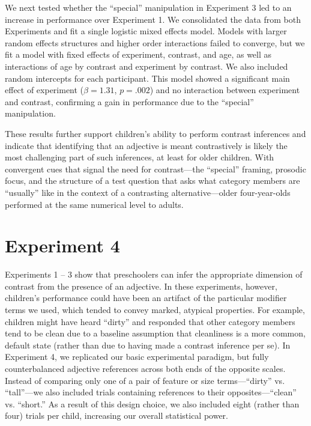 \documentclass[man]{apa2}
\begin{document}
We next tested whether the ``special'' manipulation in Experiment 3 led to an increase in performance over Experiment 1. We consolidated the data from both Experiments and fit a single logistic mixed effects model. Models with larger random effects structures and higher order interactions failed to converge, but we fit a model with fixed effects of experiment, contrast, and age, as well as interactions of age by contrast and experiment by contrast. We also included random intercepts for each participant. This model showed a significant main effect of experiment ($\beta = 1.31$, $p = .002$) and no interaction between experiment and contrast, confirming a gain in performance due to the ``special'' manipulation. 

These results further support children's ability to perform contrast inferences and indicate that identifying that an adjective is meant contrastively is likely the most challenging part of such inferences, at least for older children. With convergent cues that signal the need for contrast---the ``special'' framing, prosodic focus, and the structure of a test question that asks what category members are ``usually'' like in the context of a contrasting alternative---older four-year-olds performed at the same numerical level to adults.

\section{Experiment 4} 

Experiments 1 -- 3 show that preschoolers can infer the appropriate dimension of contrast from the presence of an adjective. In these experiments, however, children's performance could have been an artifact of the particular modifier terms we used, which tended to convey marked, atypical properties. For example, children might have heard ``dirty'' and responded that other category members tend to be clean due to a baseline assumption that cleanliness is a more common, default state (rather than due to having made a contrast inference per se). In Experiment 4, we replicated our basic experimental paradigm, but fully counterbalanced adjective references across both ends of the opposite scales. Instead of comparing only one of a pair of feature or size terms---``dirty'' vs. ``tall''---we also included trials containing references to their opposites---``clean'' vs. ``short.''  As a result of this design choice, we also included eight (rather than four) trials per child, increasing our overall statistical power.
\end{document}
